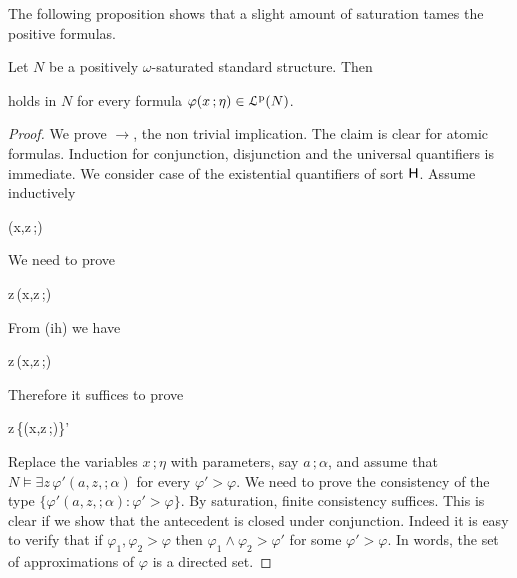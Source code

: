 \documentclass[10pt,oneside]{amsproc}
\begin{document}
The following proposition shows that a slight amount of saturation tames the positive formulas.

\begin{proposition}\label{prop_approx}
  Let $N$ be a positively $\omega$-saturated standard structure.
  Then 
  
  
  holds in $N$ for every formula $\varphi(x\,;\eta)\in{\EuScript L}^{\rm p}(N)$.
\end{proposition}

\begin{proof}
  We prove $\rightarrow$, the non trivial implication.
  The claim is clear for atomic formulas.
  Induction for conjunction, disjunction and the universal quantifiers is immediate.
%
%
%
%
%
  We consider case of the existential quantifiers of sort ${\sf H}$.
  Assume inductively
  
  {\rightarrow}
  {\varphi(x,z\,;\eta)}

  We need to prove

  {\rightarrow}
  {\exists z\,\varphi(x,z\,;\eta)}

  From (ih) we have

  {\rightarrow}
  {\exists z\,\varphi(x,z\,;\eta)}

  Therefore it suffices to prove

  {\rightarrow}
  {\exists z\,\{\varphi(x,z\,;\eta)\}'}

Replace the variables $x\,;\eta$ with parameters, say $a\,;\alpha$, and assume that $N\models\exists z\,\varphi'(a,z,;\alpha)$ for every $\varphi'>\varphi$.
We need to prove the consistency of the type $\{\varphi'(a,z,;\alpha):\varphi'>\varphi\}$.
By saturation, finite consistency suffices.
This is clear if we show that the antecedent is closed under conjunction.
Indeed it is easy to verify that if $\varphi_1,\varphi_2>\varphi$ then $\varphi_1\wedge\varphi_2>\varphi'$ for some $\varphi'>\varphi$.
In words, the set of approximations of $\varphi$ is a directed set.


\end{proof}
\end{document}
